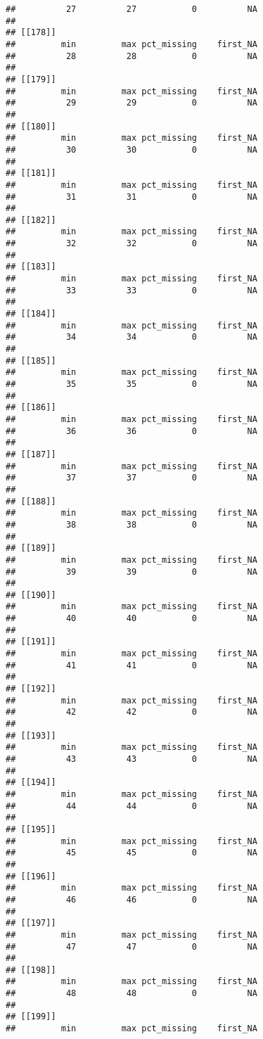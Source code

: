 \documentclass[
]{article}
\begin{document}
\begin{verbatim}
##          27          27           0          NA 
## 
## [[178]]
##         min         max pct_missing    first_NA 
##          28          28           0          NA 
## 
## [[179]]
##         min         max pct_missing    first_NA 
##          29          29           0          NA 
## 
## [[180]]
##         min         max pct_missing    first_NA 
##          30          30           0          NA 
## 
## [[181]]
##         min         max pct_missing    first_NA 
##          31          31           0          NA 
## 
## [[182]]
##         min         max pct_missing    first_NA 
##          32          32           0          NA 
## 
## [[183]]
##         min         max pct_missing    first_NA 
##          33          33           0          NA 
## 
## [[184]]
##         min         max pct_missing    first_NA 
##          34          34           0          NA 
## 
## [[185]]
##         min         max pct_missing    first_NA 
##          35          35           0          NA 
## 
## [[186]]
##         min         max pct_missing    first_NA 
##          36          36           0          NA 
## 
## [[187]]
##         min         max pct_missing    first_NA 
##          37          37           0          NA 
## 
## [[188]]
##         min         max pct_missing    first_NA 
##          38          38           0          NA 
## 
## [[189]]
##         min         max pct_missing    first_NA 
##          39          39           0          NA 
## 
## [[190]]
##         min         max pct_missing    first_NA 
##          40          40           0          NA 
## 
## [[191]]
##         min         max pct_missing    first_NA 
##          41          41           0          NA 
## 
## [[192]]
##         min         max pct_missing    first_NA 
##          42          42           0          NA 
## 
## [[193]]
##         min         max pct_missing    first_NA 
##          43          43           0          NA 
## 
## [[194]]
##         min         max pct_missing    first_NA 
##          44          44           0          NA 
## 
## [[195]]
##         min         max pct_missing    first_NA 
##          45          45           0          NA 
## 
## [[196]]
##         min         max pct_missing    first_NA 
##          46          46           0          NA 
## 
## [[197]]
##         min         max pct_missing    first_NA 
##          47          47           0          NA 
## 
## [[198]]
##         min         max pct_missing    first_NA 
##          48          48           0          NA 
## 
## [[199]]
##         min         max pct_missing    first_NA 

\end{verbatim}
\end{document}
